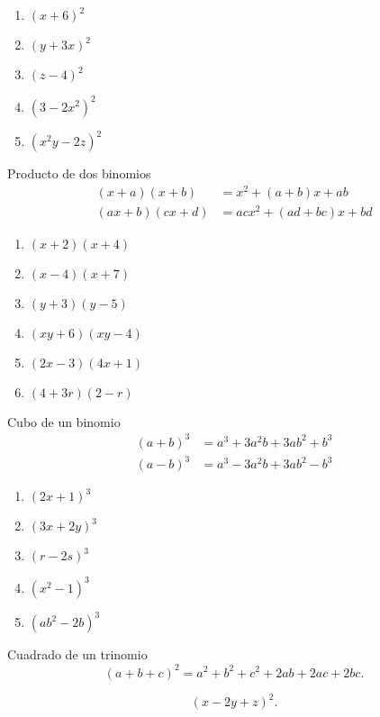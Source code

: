 	\begin{problema}
		\begin{enumerate}
			\item $\left( x+6 \right)^{2}$ 
			\item $\left( y+3x \right)^{2}$ 
			\item $\left( z-4 \right)^{2}$ 
			\item $\left( 3-2x^{2} \right)^{2}$  
			\item $\left( x^{2}y-2z \right)^{2}$ 
		\end{enumerate}
		
	\end{problema}
	



{Producto de dos binomios}
	\begin{align}
		\left( x+a \right)\left( x+b \right)&=
		x^{2}+\left( a+b \right)x+ab\\
		\left( ax+b \right)\left( cx+d \right)&=
		acx^{2}+\left( ad+bc \right)x+bd
	\end{align}
	



	\begin{problema}
		\begin{enumerate}
			\item $\left( x+2 \right)\left( x+4 \right)$ 
			\item $\left( x-4 \right)\left( x+7 \right)$ 
			\item $\left( y+3 \right)\left( y-5 \right)$ 
			\item $\left( xy+6 \right)\left( xy-4 \right)$ 
			\item $\left( 2x-3 \right)\left( 4x+1 \right)$ 
			\item $\left( 4+3r \right)\left( 2-r \right)$
		\end{enumerate}
		
	\end{problema}
	



{Cubo de un binomio}
	\begin{align*}
		\left( a+b \right)^{3}&=
		a^{3}+3a^{2}b+3ab^{2}+b^{3}\\
		\left( a-b \right)^{3}&=
		a^{3}-3a^{2}b+3ab^{2}-b^{3}
	\end{align*}
	



	\begin{problema}
		\begin{enumerate}
			\item $\left( 2x+1 \right)^{3}$ 
			\item $\left( 3x+2y \right)^{3}$ 
			\item $\left( r-2s \right)^{3}$ 
			\item $\left( x^{2}-1 \right)^{3}$ 
			\item $\left( ab^{2}-2b \right)^{3}$
		\end{enumerate}
		
	\end{problema}
	



{Cuadrado de un trinomio}
	\begin{equation}
		\left( a+b+c \right)^{2}=
		a^{2}+b^{2}+c^{2}+2ab+2ac+2bc.
	\end{equation}
	



	\begin{problema}
		$$
		\left( x-2y+z \right)^{2}. 
		$$
	\end{problema}
	

